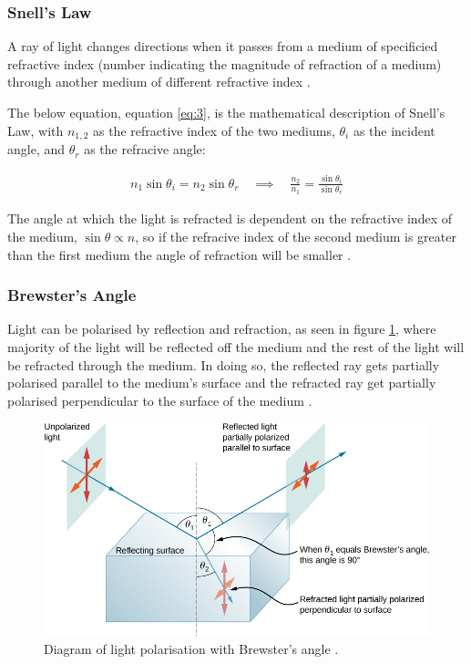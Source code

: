 \documentclass[12pt]{article}
\begin{document}
\subsubsection{Snell's Law} \label{sec:1.2.2}

A ray of light changes directions when it passes from a medium of specificied refractive index (number indicating the magnitude of refraction of a medium)
through another medium of different refractive index
\cite{libreref}.

The below equation, equation \ref{eq:3}, is the mathematical description of Snell's Law, with $n_{1,2}$ as the refractive index of the two mediums, $\theta_i$ as the incident angle,
and $\theta_r$ as the refracive angle:

\begin{gather} \label{eq:3}
    n_1 \sin \theta_i = n_2 \sin \theta_r \quad \implies \quad \frac{n_2}{n_1} = \frac{\sin \theta_i}{\sin \theta_r}
\end{gather}

The angle at which the light is refracted is dependent on the refractive index of the medium, $\sin \theta \propto n$, so if the refracive index of the second medium is greater 
than the first medium the angle of refraction will be smaller
\cite{libresnell}.

\subsubsection{Brewster's Angle} \label{sec:1.2.3}

Light can be polarised by reflection and refraction, as seen in figure \ref{fig:brew}, where majority of the light will be reflected off the medium and the rest of the light
will be refracted through the medium. In doing so, the reflected ray gets partially polarised parallel to the medium's surface and the refracted ray get partially polarised perpendicular
to the surface of the medium
\cite{geekpolar}.

\begin{figure}[H]
    \centering
    \includegraphics[width=12.5cm]{brewster.jpg}
    \caption{\centering Diagram of light polarisation with Brewster's angle \protect\cite{floridabrewster}.}
    \label{fig:brew}
\end{figure}
\end{document}
